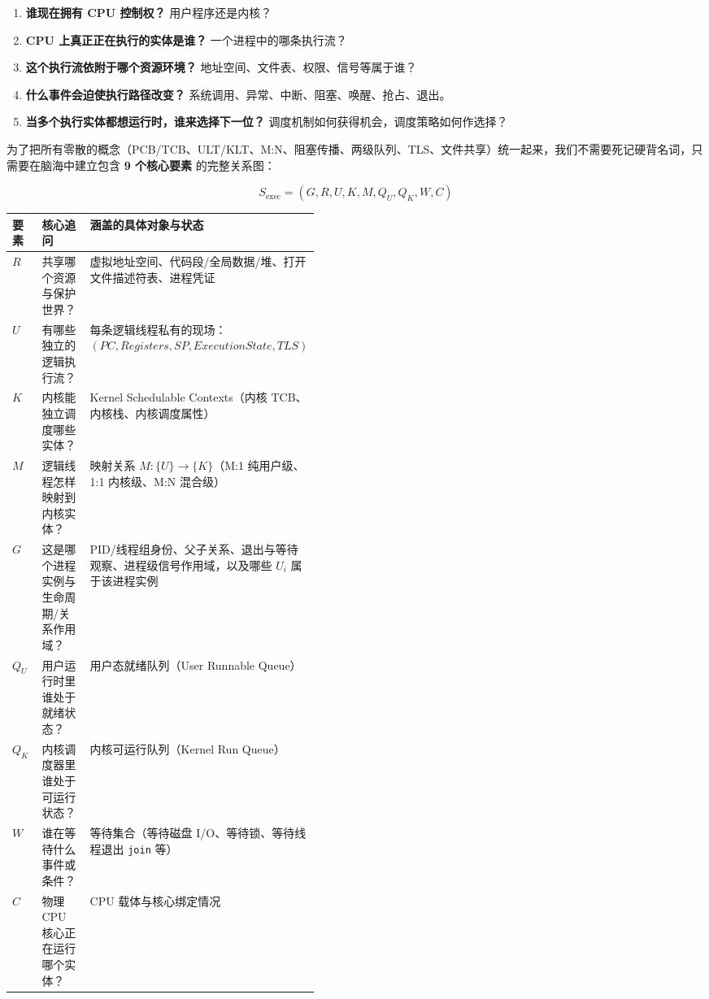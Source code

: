 \documentclass[11pt,a4paper]{ctexart}
\newcommand{\kw}[1]{\textbf{#1}}
\newcommand{\code}[1]{\texttt{#1}}
\begin{document}
\begin{enumerate}
  \item \kw{谁现在拥有 CPU 控制权？} 用户程序还是内核？
  \item \kw{CPU 上真正正在执行的实体是谁？} 一个进程中的哪条执行流？
  \item \kw{这个执行流依附于哪个资源环境？} 地址空间、文件表、权限、信号等属于谁？
  \item \kw{什么事件会迫使执行路径改变？} 系统调用、异常、中断、阻塞、唤醒、抢占、退出。
  \item \kw{当多个执行实体都想运行时，谁来选择下一位？} 调度机制如何获得机会，调度策略如何作选择？
\end{enumerate}

为了把所有零散的概念（PCB/TCB、ULT/KLT、M:N、阻塞传播、两级队列、TLS、文件共享）统一起来，我们不需要死记硬背名词，只需要在脑海中建立包含 \kw{9 个核心要素} 的完整关系图：

\[
\boxed{
S_{\text{exec}} = (G, R, U, K, M, Q_U, Q_K, W, C)
}
\]

\begingroup
\small
\renewcommand{\arraystretch}{1.22}
\setlength{\tabcolsep}{5pt}
\begin{tabularx}{\linewidth}{>{\bfseries}p{0.12\linewidth} p{0.32\linewidth} X}
\toprule
要素 & 核心追问 & 涵盖的具体对象与状态\\
\midrule
$R$ & 共享哪个资源与保护世界？ & 虚拟地址空间、代码段/全局数据/堆、打开文件描述符表、进程凭证\\
$U$ & 有哪些独立的逻辑执行流？ & 每条逻辑线程私有的现场：$(PC, Registers, SP, ExecutionState, TLS)$\\
$K$ & 内核能独立调度哪些实体？ & Kernel Schedulable Contexts（内核 TCB、内核栈、内核调度属性）\\
$M$ & 逻辑线程怎样映射到内核实体？ & 映射关系 $M: \{U\} \to \{K\}$（M:1 纯用户级、1:1 内核级、M:N 混合级）\\
$G$ & 这是哪个进程实例与生命周期/关系作用域？ & PID/线程组身份、父子关系、退出与等待观察、进程级信号作用域，以及哪些 $U_i$ 属于该进程实例\\
$Q_U$ & 用户运行时里谁处于就绪状态？ & 用户态就绪队列（User Runnable Queue）\\
$Q_K$ & 内核调度器里谁处于可运行状态？ & 内核可运行队列（Kernel Run Queue）\\
$W$ & 谁在等待什么事件或条件？ & 等待集合（等待磁盘 I/O、等待锁、等待线程退出 \code{join} 等）\\
$C$ & 物理 CPU 核心正在运行哪个实体？ & CPU 载体与核心绑定情况\\
\bottomrule
\end{tabularx}
\endgroup
\end{document}
